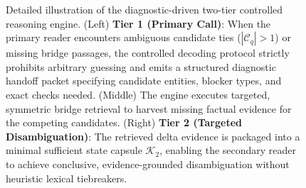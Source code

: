 \begin{figure}[t]
\centering
\resizebox{0.92\linewidth}{!}{}
\vspace{2.5mm}
\caption{Detailed illustration of the diagnostic-driven two-tier controlled reasoning engine. (Left) \textbf{Tier 1 (Primary Call)}: When the primary reader encounters ambiguous candidate ties ($|\mathcal{C}_q| > 1$) or missing bridge passages, the controlled decoding protocol strictly prohibits arbitrary guessing and emits a structured diagnostic handoff packet specifying candidate entities, blocker types, and exact checks needed. (Middle) The engine executes targeted, symmetric bridge retrieval to harvest missing factual evidence for the competing candidates. (Right) \textbf{Tier 2 (Targeted Disambiguation)}: The retrieved delta evidence is packaged into a minimal sufficient state capsule $\mathcal{K}_2$, enabling the secondary reader to achieve conclusive, evidence-grounded disambiguation without heuristic lexical tiebreakers.}
\vspace{-2mm}
\label{fig:diagnostic-l2}
\end{figure}
